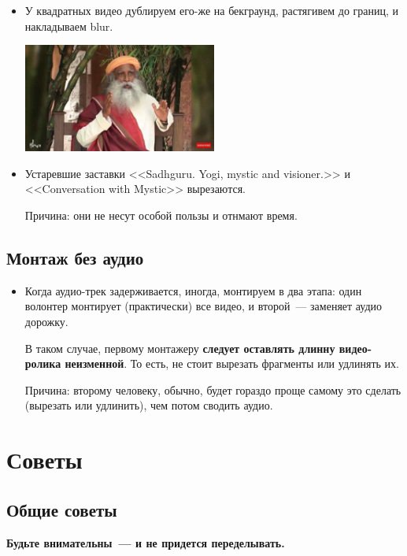 \documentclass[
a4paper, %
12pt, %
article,
onecolumn, %
openany, %
]{memoir}
\begin{document}
\begin{itemize}

    \item У квадратных видео дублируем его-же на бекграунд, растягивем до границ,
        и накладываем blur.
        \begin{center} \includegraphics[width=0.5\textwidth]{tooWide}  \end{center}

    \item Устаревшие заставки <<Sadhguru. Yogi, mystic and visioner.>> и
        <<Conversation with Mystic>> вырезаются.

        {\color{gray}Причина: они не несут особой пользы и отнмают время.}
\end{itemize}


\subsection{Монтаж без аудио}

\begin{itemize}
    \item Когда аудио-трек задерживается, иногда, монтируем в два
        этапа: один волонтер монтирует (практически) все видео, и
        второй~--- заменяет аудио дорожку.

        В таком случае, первому монтажеру \textbf{следует оставлять
        длинну видео-ролика неизменной}. То есть, не стоит вырезать
        фрагменты или удлинять их.

        Причина: второму человеку, обычно, будет гораздо проще
        самому это сделать (вырезать или удлинить), чем потом сводить аудио.
\end{itemize}

\newpage
\section{Советы}\label{advices}

\subsection{Общие советы}
\textbf{Будьте внимательны~--- и не придется переделывать.}
\end{document}
